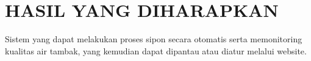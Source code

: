 \section {HASIL YANG DIHARAPKAN}

Sistem yang dapat melakukan proses sipon secara otomatis serta memonitoring kualitas air tambak, yang kemudian dapat dipantau atau diatur melalui website.